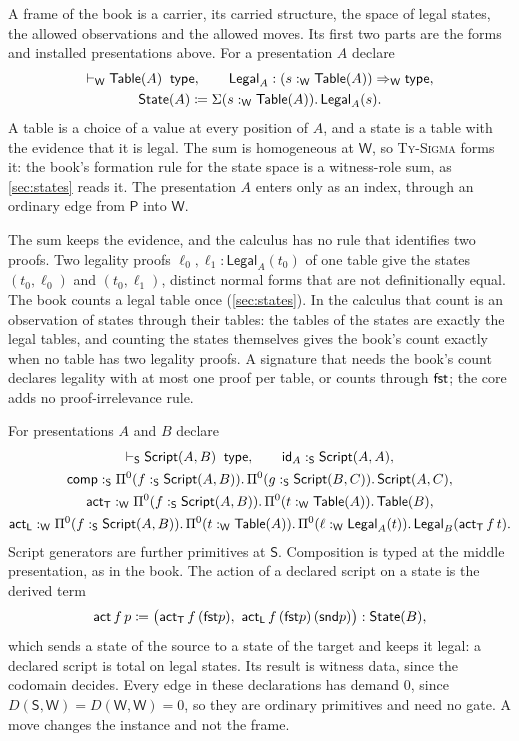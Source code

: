 \documentclass[11pt]{article}
\numberwithin{equation}{section}
\theoremstyle{definition}
\theoremstyle{plain}
\theoremstyle{remark}
\newcommand{\Type}{\mathsf{type}}
\newcommand{\Script}{\AFScript}
\newcommand{\State}{\AFState}
\newcommand{\Prs}{\mathsf P}
\newcommand{\Wit}{\mathsf W}
\newcommand{\Scr}{\mathsf S}
\newcommand{\jtype}{\mathrel{\mathsf{type}}}
\newcommand{\fst}{\AFFst}
\newcommand{\snd}{\AFSnd}
\begin{document}
A frame of the book is a carrier, its carried structure, the space of legal
states, the allowed observations and the allowed moves.  Its first two parts
are the forms and installed presentations above.  For a presentation \(A\)
declare
\[
\begin{gathered}
 \vdash_{\Wit}\mathsf{Table}(A)\;\jtype,
 \qquad
 \mathsf{Legal}_A:(s:_{\Wit}\mathsf{Table}(A))\Rightarrow_{\Wit}\Type,\\
 \State(A)\coloneqq
 \AFDepPair(s:_{\Wit}\mathsf{Table}(A)).\,\mathsf{Legal}_A(s).
\end{gathered}
\]
A table is a choice of a value at every position of \(A\), and a state is a
table with the evidence that it is legal.  The sum is homogeneous at
\(\Wit\), so \textsc{Ty-Sigma} forms it: the book's formation rule for the
state space is a witness-role sum, as \cref{sec:states} reads it.  The
presentation \(A\) enters only as an index, through an ordinary edge from
\(\Prs\) into \(\Wit\).

The sum keeps the evidence, and the calculus has no rule that identifies two
proofs.  Two legality proofs \(\ell_0,\ell_1:\mathsf{Legal}_A(t_0)\) of one
table give the states \((t_0,\ell_0)\) and \((t_0,\ell_1)\), distinct normal
forms that are not definitionally equal.  The book counts a legal table once
(\cref{sec:states}).  In the calculus that count is an observation of states
through their tables: the tables of the states are exactly the legal tables,
and counting the states themselves gives the book's count exactly when no
table has two legality proofs.  A signature that needs the book's count
declares legality with at most one proof per table, or counts through
\(\fst\); the core adds no proof-irrelevance rule.

For presentations \(A\) and \(B\) declare
\[
\begin{gathered}
 \vdash_{\Scr}\Script(A,B)\;\jtype,
 \qquad
 \mathsf{id}_A:_{\Scr}\Script(A,A),\\
 \mathsf{comp}:_{\Scr}
 \AFDepFun^0(f:_{\Scr}\Script(A,B)).\,
 \AFDepFun^0(g:_{\Scr}\Script(B,C)).\,\Script(A,C),\\
 \mathsf{act}_{\mathsf T}:_{\Wit}
 \AFDepFun^0(f:_{\Scr}\Script(A,B)).\,
 \AFDepFun^0(t:_{\Wit}\mathsf{Table}(A)).\,\mathsf{Table}(B),\\
 \mathsf{act}_{\mathsf L}:_{\Wit}
 \AFDepFun^0(f:_{\Scr}\Script(A,B)).\,
 \AFDepFun^0(t:_{\Wit}\mathsf{Table}(A)).\,
 \AFDepFun^0(\ell:_{\Wit}\mathsf{Legal}_A(t)).\,
 \mathsf{Legal}_B(\mathsf{act}_{\mathsf T}\,f\,t).
\end{gathered}
\]
Script generators are further primitives at \(\Scr\).  Composition is typed
at the middle presentation, as in the book.  The action of a declared script
on a state is the derived term
\[
 \mathsf{act}\,f\,p\coloneqq
 \bigl(\mathsf{act}_{\mathsf T}\,f\,(\fst p),\
 \mathsf{act}_{\mathsf L}\,f\,(\fst p)\,(\snd p)\bigr):\State(B),
\]
which sends a state of the source to a state of the target and keeps it
legal: a declared script is total on legal states.  Its result is witness
data, since
the codomain decides.  Every edge in these declarations has demand \(0\),
since \(D(\Scr,\Wit)=D(\Wit,\Wit)=0\), so they are ordinary primitives and
need no gate.  A move changes the instance and not the frame.
\end{document}
